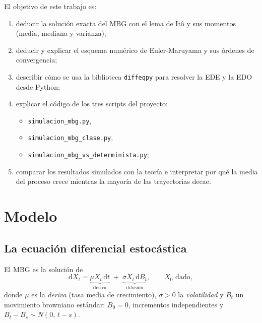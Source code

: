 \documentclass[11pt,a4paper]{article}
\newcommand{\dd}{\mathrm{d}}
\begin{document}
El objetivo de este trabajo es:
\begin{enumerate}
    \item deducir la solución exacta del MBG con el lema de Itô y sus momentos (media, mediana y varianza);
    \item deducir y explicar el esquema numérico de Euler-Maruyama y sus órdenes de convergencia;
    \item describir cómo se usa la biblioteca \texttt{diffeqpy} para resolver la EDE y la EDO desde Python;
    \item explicar el código de los tres scripts del proyecto:
    \begin{itemize}
        \item \texttt{simulacion\_mbg.py},
        \item \texttt{simulacion\_mbg\_clase.py},
        \item \texttt{simulacion\_mbg\_vs\_determinista.py};
    \end{itemize}
    \item comparar los resultados simulados con la teoría e interpretar por qué la media del proceso crece mientras la mayoría de las trayectorias decae.
\end{enumerate}

\section{Modelo}

\subsection{La ecuación diferencial estocástica}

El MBG es la solución de
\begin{equation}
    \dd X_t = \underbrace{\mu X_t\,\dd t}_{\text{deriva}} \;+\; \underbrace{\sigma X_t\,\dd B_t}_{\text{difusión}},
    \qquad X_0 \text{ dado},
    \label{eq:ede}
\end{equation}
donde $\mu$ es la \emph{deriva} (tasa media de crecimiento), $\sigma > 0$ la \emph{volatilidad} y $B_t$ un movimiento browniano estándar: $B_0 = 0$, incrementos independientes y $B_t - B_s \sim N(0,\,t-s)$.
\end{document}
